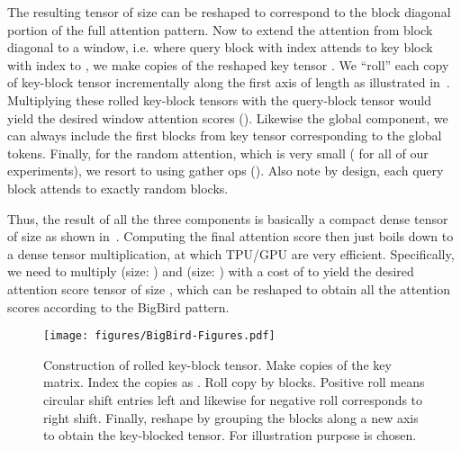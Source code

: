 \documentclass{article}
\begin{document}
The resulting  tensor of size  can be reshaped to correspond to the block diagonal portion of the full attention pattern.
Now to extend the attention from block diagonal to a window, i.e. where query block with index  attends to key block with index  to , we make  copies of the reshaped key tensor .
We ``roll'' each copy of key-block tensor incrementally along the first axis of length  as illustrated in~.
Multiplying these  rolled key-block tensors with the query-block tensor would yield the desired window attention scores ().
Likewise the global component, we can always include the first  blocks from key tensor corresponding to the global tokens.
Finally, for the random attention, which is very small ( for all of our experiments), we resort to using gather ops (). 
Also note by design, each query block attends to exactly  random blocks.

Thus, the result of all the three components is basically a compact dense tensor  of size  as shown in~.
Computing the final attention score then just boils down to a dense tensor multiplication, at which TPU/GPU are very efficient.
Specifically, we need to multiply  (size: ) and  (size: ) with a cost of  to yield the desired attention score tensor of size , which can be reshaped to obtain all the attention scores according to the BigBird pattern.

\begin{figure}
    \vspace{-7mm}
    \centering
    \texttt{[image: figures/BigBird-Figures.pdf]}
    \caption{Construction of rolled key-block tensor. Make  copies of the key matrix. Index the copies as  . Roll  copy by  blocks. Positive roll means circular shift entries left and likewise for negative roll corresponds to right shift. Finally, reshape by grouping the blocks along a new axis to obtain the key-blocked tensor. For illustration purpose  is chosen.}
    \label{fig:apndx_copy-roll}
    \vspace{-2mm}
\end{figure}
\end{document}
